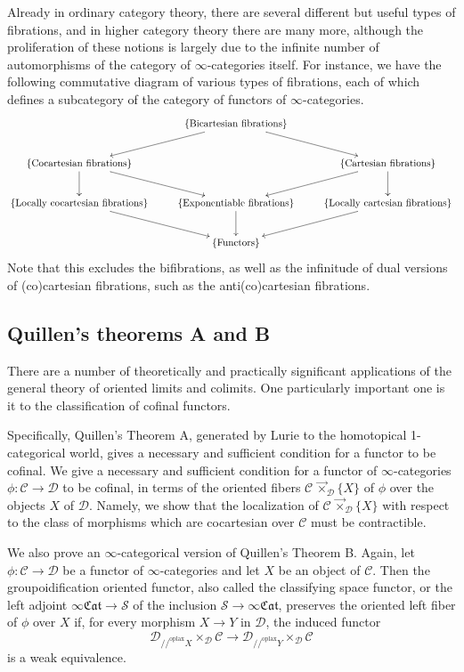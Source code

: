 \documentclass[10pt,oneside]{article}
\numberwithin{equation}{section} %
\numberwithin{figure}{section} %
\theoremstyle{plain}
\theoremstyle{definition}
\newcommand{\mC}{{\mathcal C}}
\newcommand{\mD}{{\mathcal D}}
\newcommand{\mS}{{\mathcal S}}
\newcommand{\Y}{Y}
\newcommand{\oplax}{{\mathrm{oplax}}}
\newcommand{\fcat}{\mathfrak{Cat}}
\begin{document}
Already in ordinary category theory, there are several different but useful types of fibrations, and in higher category theory there are many more, although the proliferation of these notions is largely due to the infinite number of automorphisms of the category of $\infty$-categories itself.
For instance, we have the following commutative diagram of various types of fibrations, each of which defines a subcategory of the category of functors of $\infty$-categories.
$$
\begin{xy}
\xymatrix{
 &   \{ {\mathrm{Bicartesian} \ \mathrm{fibrations}} \} \ar[ld]\ar[rd] &
\\
\{ \mathrm{Cocartesian} \ \mathrm{fibrations} \}  \ar[rd] \ar[d] & 
& \{ \mathrm{Cartesian} \ \mathrm{fibrations}  \} \ar[ld] \ar[d]\\
\{ {\mathrm{Locally} \ \mathrm{cocartesian} \ \mathrm{fibrations} \} } \ar[rd] & \{ \mathrm{Exponentiable} \ \mathrm{fibrations} \} \ar[d] & {\{\mathrm{Locally} \ \mathrm{cartesian} \ \mathrm{fibrations} \} }  \ar[ld] \\
& \{ \mathrm{Functors}\} &
}
\end{xy} $$
Note that this excludes the bifibrations, as well as the infinitude of dual versions of (co)cartesian fibrations, such as the anti(co)cartesian fibrations.






\subsection{Quillen's theorems A and B}
There are a number of theoretically and practically significant applications of the general theory of
oriented limits and colimits. One particularly important one is it to the classification of cofinal functors.

Specifically,
Quillen's Theorem A, generated by Lurie to the homotopical 1-categorical world, gives a necessary and
sufficient condition for a functor to be cofinal.
We give a necessary and sufficient condition for a functor of $\infty$-categories $\phi: \mC \to \mD $ to be cofinal, in terms of the oriented fibers
$ \mC \,{\vec{\times}}_\mD \{ X \} $ of $\phi$ over the objects $X$ of $\mD$.
Namely, we show that the localization of $\mC \,{\vec{\times}}_\mD \{ X \} $ with respect to the class of morphisms which are cocartesian over $\mC$ must be contractible. 

We also prove an $\infty$-categorical version of Quillen's Theorem B.
Again, let $\phi: \mC \to \mD $ be a functor of $\infty$-categories and let $X$ be an object of $\mC$.
Then the groupoidification oriented functor, also called the classifying space functor, or the left adjoint $\infty\fcat \to \mS$ of the inclusion $\mS\to\infty\fcat$,
preserves the oriented left fiber of $\phi $ over $X$ if, for every morphism $X \to \Y$ in $\mD$, the induced functor
$$ \mD_{//^\oplax X} \times_\mD \mC \to \mD_{//^\oplax Y} \times_\mD \mC $$ is a weak equivalence.
\end{document}
